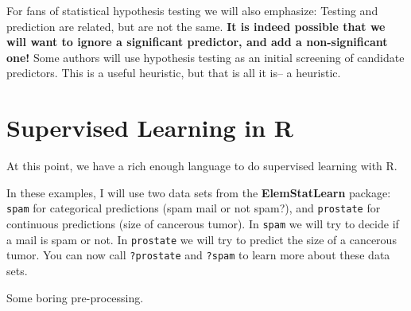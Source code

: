 \documentclass[]{book}
\theoremstyle{definition}
\theoremstyle{definition}
\theoremstyle{remark}
\begin{document}
For fans of statistical hypothesis testing we will also emphasize:
Testing and prediction are related, but are not the same. \textbf{It is
indeed possible that we will want to ignore a significant predictor, and
add a non-significant one!} \citep{foster2004variable} Some authors will
use hypothesis testing as an initial screening of candidate predictors.
This is a useful heuristic, but that is all it is-- a heuristic.

\section{Supervised Learning in R}\label{supervised-learning-in-r}

At this point, we have a rich enough language to do supervised learning
with R.

In these examples, I will use two data sets from the
\textbf{ElemStatLearn} package: \texttt{spam} for categorical
predictions (spam mail or not spam?), and \texttt{prostate} for
continuous predictions (size of cancerous tumor). In \texttt{spam} we
will try to decide if a mail is spam or not. In \texttt{prostate} we
will try to predict the size of a cancerous tumor. You can now call
\texttt{?prostate} and \texttt{?spam} to learn more about these data
sets.

Some boring pre-processing.
\end{document}
